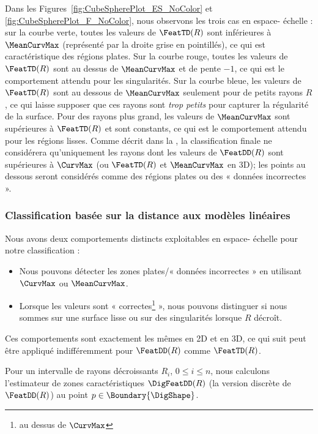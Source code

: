 Dans les Figures~\ref{fig:CubeSpherePlot_ES_NoColor} et
\ref{fig:CubeSpherePlot_F_NoColor}, nous observons les trois cas en espace-
échelle : sur la courbe verte, toutes les valeurs de $\FeatTD(R)$ sont
inférieures à $\MeanCurvMax$ (représenté par la droite grise en pointillés),
ce qui est caractéristique des régions plates. Sur la courbe rouge, toutes les
valeurs de $\FeatTD(R)$ sont au dessus de $\MeanCurvMax$ et de pente $-1$, ce
qui est le comportement attendu pour les singularités. Sur la courbe bleue, les
valeurs de $\FeatTD(R)$ sont au dessous de $\MeanCurvMax$ seulement pour de
petits rayons $R$, ce qui laisse supposer que ces rayons sont \emph{trop
petits} pour capturer la régularité de la surface. Pour des rayons plus grand,
les valeurs de $\MeanCurvMax$ sont supérieures à $\FeatTD(R)$ et sont
constants, ce qui est le comportement attendu pour les régions lisses. Comme
décrit dans la , la classification finale ne
considérera qu'uniquement les rayons dont les valeurs de $\FeatDD(R)$ sont
supérieures à $\CurvMax$ (ou $\FeatTD(R)$ et $\MeanCurvMax$ en 3D); les points
au dessous seront considérés comme des régions plates ou des « données
incorrectes ».

\subsubsection{Classification basée sur la distance aux modèles linéaires}
\label{sec:applications:feature:II:classification}

Nous avons deux comportements distincts exploitables en espace- échelle pour
notre classification :
\begin{itemize}
   \item Nous pouvons détecter les zones plates/« données incorrectes » en
         utilisant $\CurvMax$ ou $\MeanCurvMax$.
   \item Lorsque les valeurs sont « correctes\footnote{\cad au dessus de
         $\CurvMax$} », nous pouvons distinguer si nous sommes sur une surface
         lisse ou sur des singularités lorsque $R$ décroît.
\end{itemize}
Ces comportements sont exactement les mêmes en 2D et en 3D, ce qui suit peut
être appliqué indifféremment pour $\FeatDD(R)$ comme $\FeatTD(R)$.

Pour un intervalle de rayons décroissants $R_i$, $0 \leq i \leq n$, nous
calculons l'estimateur de zones caractéristiques $\DigFeatDD(R)$ (la version
discrète de $\FeatDD(R)$) au point $p \in \Boundary{\DigShape}$.

